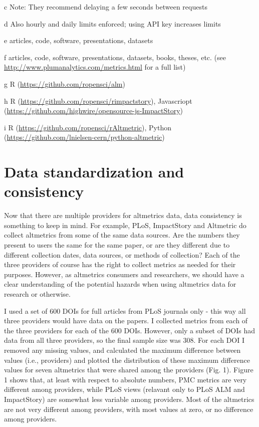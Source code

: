 \documentclass[letterpaper,superscriptaddress,showkeys,longbibliography]{revtex4-1}\usepackage{graphicx, color}
\begin{document}
\begin{table}[!ht]
\begin{threeparttable}[b]
\begin{tablenotes}
            \item[c] Note: They recommend delaying a few seconds between requests
            \item[d] Also hourly and daily limits enforced; using API key increases limits
            \item[e] articles, code, software, presentations, datasets
            \item[f] articles, code, software, presentations, datasets, books, theses, etc. (see \url{http://www.plumanalytics.com/metrics.html} for a full list)
            \item[g] R (\url{https://github.com/ropensci/alm})
            \item[h] R (\url{https://github.com/ropensci/rimpactstory}), Javascriopt (\url{https://github.com/highwire/opensource-js-ImpactStory})
            \item[i] R (\url{https://github.com/ropensci/rAltmetric}), Python (\url{https://github.com/lnielsen-cern/python-altmetric})
        \end{tablenotes}
    \end{threeparttable}
\end{table}

\section*{Data standardization and consistency}

Now that there are multiple providers for altmetrics data, data consistency is something to keep in mind. For example, PLoS, ImpactStory and Altmetric do collect altmetrics from some of the same data sources. Are the numbers they present to users the same for the same paper, or are they different due to different collection dates, data sources, or methods of collection? Each of the three providers of course has the right to collect metrics as needed for their purposes. However, as altmetrics consumers and researchers, we should have a clear understanding of the potential hazards when using altmetrics data for research or otherwise. 

I used a set of 600 DOIs for full articles from PLoS journals only - this way all three providers would have data on the papers. I collected metrics from each of the three providers for each of the 600 DOIs. However, only a subset of DOIs had data from all three providers, so the final sample size was 308. For each DOI I removed any missing values, and calculated the maximum difference between values (i.e., providers) and plotted the distribution of these maximum difference values for seven altmetrics that were shared among the providers (Fig. 1). Figure 1 shows that, at least with respect to absolute numbers, PMC metrics are very different among providers, while PLoS views (relavant only to PLoS ALM and ImpactStory) are somewhat less variable among providers. Most of the altmetrics are not very different among providers, with most values at zero, or no difference among providers. 
\end{document}

